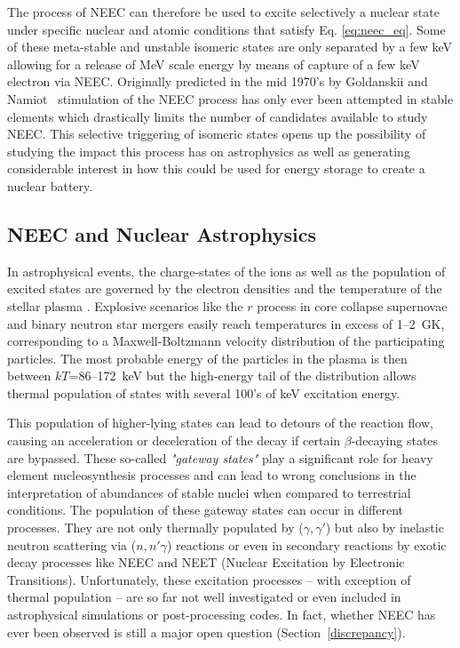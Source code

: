 \documentclass[cnatzke_thesis_proposal.tex]{subfiles}
\begin{document}
    The process of NEEC can therefore be used to excite selectively a nuclear state under specific nuclear and atomic conditions that satisfy Eq. \ref{eq:neec_eq}.
    Some of these meta-stable and unstable isomeric states are only separated by a few keV allowing for a release of MeV scale energy by means of capture of a few keV electron via NEEC.
    Originally predicted in the mid 1970's by Goldanskii and Namiot~\cite{Goldanskii1976} stimulation of the NEEC process has only ever been attempted in stable elements which drastically limits the number of candidates available to study NEEC.
    This selective triggering of isomeric states opens up the possibility of studying the impact this process has on astrophysics as well as generating considerable interest in how this could be used for energy storage to create a nuclear battery.



    \subsection{NEEC and Nuclear Astrophysics}

    In astrophysical events, the charge-states of the ions as well as the population of excited states are governed by the electron densities and the temperature of the stellar plasma \cite{eec_SOP_NEEC}.
    Explosive scenarios like the $r$ process in core collapse supernovae and binary neutron star mergers easily reach temperatures in excess of 1--2~GK, corresponding to a Maxwell-Boltzmann velocity distribution of the participating particles.
    The most probable energy of the particles in the plasma is then between $kT$=86--172~keV but the high-energy tail of the distribution allows thermal population of states with several 100's of keV excitation energy.

    This population of higher-lying states can lead to detours of the reaction flow, causing an acceleration or deceleration of the decay if certain $\beta$-decaying states are bypassed.
    These so-called \textit{"gateway states"} play a significant role for heavy element nucleosynthesis processes and can lead to wrong conclusions in the interpretation of abundances of stable nuclei when compared to terrestrial conditions.
    The population of these gateway states can occur in different processes.
    They are not only thermally populated by ($\gamma, \gamma'$) but also by inelastic neutron scattering via ($n,n' \gamma$) reactions or even in secondary reactions by exotic decay processes like NEEC and NEET (Nuclear Excitation by Electronic Transitions).
    Unfortunately, these excitation processes -- with exception of thermal population -- are so far not well investigated or even included in astrophysical simulations or post-processing codes.
    In fact, whether NEEC has ever been observed is still a major open question (Section~\ref{discrepancy}).
\end{document}
